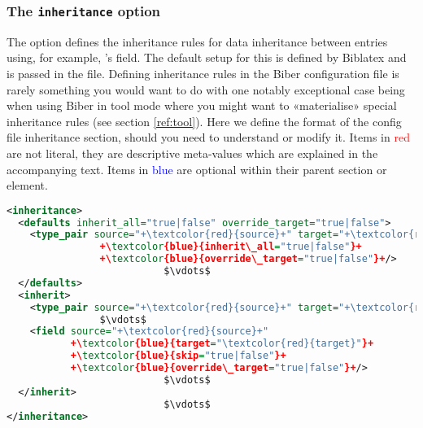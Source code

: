 \documentclass{ltxdockit}
\newcommand*{\biber}{Biber\xspace}
\newcommand*{\biblatex}{Biblatex\xspace}
\begin{document}
\subsubsection{The \texttt{inheritance} option}\label{inheritance}

The  option defines the inheritance rules for data
inheritance between entries using, for example, \bibtex's
 field. The default setup for this is defined by
\biblatex and is passed in the  file. Defining inheritance rules
in the \biber configuration file is rarely something you would want to do
with one notably exceptional case being when using \biber in tool mode
where you might want to «materialise» special inheritance rules (see
section \ref{ref:tool}). Here we define the format of the config file
inheritance section, should you need to understand or modify it. Items in
\textcolor{red}{red} are not literal, they are descriptive meta-values
which are explained in the accompanying text. Items in
\textcolor{blue}{blue} are optional within their parent section or element.

\begin{lstlisting}[language=xml,escapechar=+,mathescape=true]
<inheritance>
  <defaults inherit_all="true|false" override_target="true|false">
    <type_pair source="+\textcolor{red}{source}+" target="+\textcolor{red}{target}+"
                +\textcolor{blue}{inherit\_all="true|false"}+
                +\textcolor{blue}{override\_target="true|false"}+/>
                           $\vdots$
  </defaults>
  <inherit>
    <type_pair source="+\textcolor{red}{source}+" target="+\textcolor{red}{target}+"/>
                $\vdots$
    <field source="+\textcolor{red}{source}+"
           +\textcolor{blue}{target="\textcolor{red}{target}"}+
           +\textcolor{blue}{skip="true|false"}+
           +\textcolor{blue}{override\_target="true|false"}+/>
                           $\vdots$
  </inherit>
                           $\vdots$
</inheritance>
\end{lstlisting}
\end{document}
